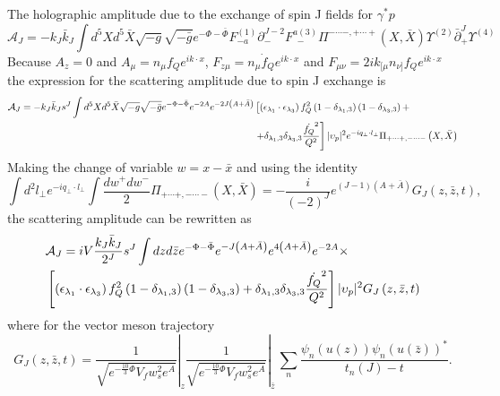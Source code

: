 \documentclass[10 pt]{article}
\begin{document}
The holographic amplitude due to the exchange of spin J fields for $\gamma^* p$
\begin{equation}
\mathcal{A}_J = - k_J \bar{k}_J \int d^5X d^5 \bar{X} \sqrt{-g} \sqrt{-\bar{g}} e^{-\Phi -\bar{\Phi}} F^{(1)}_{- a} \partial_{-}^{J-2} F^{a (3)}_{\, \, \, -} \Pi^{- \cdots -, + \cdots +} \left(X, \bar{X}\right) \Upsilon^{(2)} \bar{\partial}^J_{+} \Upsilon^{(4)}
\end{equation}
Because $A_z = 0$ and $A_\mu = n_\mu f_Q e^{i k \cdot x}$, $F_{z\mu} = n_\mu \dot{f}_Q e^{i k \cdot x}$ and $F_{\mu\nu} = 2 i k_{[\mu}n_{\nu]} f_Q e^{i k \cdot x}$
the expression for the scattering amplitude due to spin J exchange is
\begin{align}
\mathcal{A}_J = - k_J \bar{k}_J s^J \int d^5X d^5\bar{X} \sqrt{-g} \sqrt{-\bar{g}} e^{- \Phi - \bar{\Phi}} e^{-2A} e^{-2J\left(A+\bar{A}\right)} &\left[ \left( \epsilon_{\lambda_1} \cdot \epsilon_{\lambda_3}\right) f_Q^2 \left(1-\delta_{\lambda_1,3}\right) \left(1-\delta_{\lambda_3,3}\right) +  \right. \notag \\
&\left. + \delta_{\lambda_1,3} \delta_{\lambda_3, 3} \frac{\dot{f_Q}^2}{Q^2}\right] |\upsilon_p|^2 e^{-i q_\perp \cdot l_\perp} \Pi_{+ \cdots +, - \cdots -} \left(X, \bar{X}\right)
\end{align}
Making the change of variable $w = x - \bar{x}$  and using the identity
\begin{equation}
\int d^2 l_\perp e^{- i q_\perp \cdot l_\perp}\int \frac{dw^+ dw^-}{2} \Pi_{+\cdots+, - \cdots -} \left(X, \bar{X}\right) = - \frac{i}{\left(-2\right)^J} e^{\left(J-1\right)\left(A+\bar{A}\right)} G_J \left(z, \bar{z}, t\right),
\end{equation}
the scattering amplitude can be rewritten as
\begin{align}
&\mathcal{A}_J = i V \frac{k_J \bar{k}_J}{2^J} s^J \int dz d\bar{z} e^{-\Phi -\bar{\Phi}} e^{-J\left(A+\bar{A}\right)} e^{4\left(A+\bar{A}\right)} e^{-2A} \times  \notag \\
&\left[ \left( \epsilon_{\lambda_1} \cdot \epsilon_{\lambda_3}\right) f_Q^2 \left(1-\delta_{\lambda_1,3}\right) \left(1-\delta_{\lambda_3,3}\right) + \delta_{\lambda_1,3} \delta_{\lambda_3, 3} \frac{\dot{f_Q}^2}{Q^2}\right]  |\upsilon_p|^2 G_J \left(z, \bar{z}, t\right)
\end{align}
 where for the vector meson trajectory
\begin{equation}
G_J \left(z, \bar{z}, t \right)  = \left.\frac{1}{\sqrt{e^{-\frac{10}{3}\Phi} V_f w_s^2 e^A}}\right|_z  \left.\frac{1}{\sqrt{e^{-\frac{10}{3}\Phi} V_f w_s^2 e^A}}\right|_{\bar{z}} \, \sum_n \frac{\psi_n \left(u\left(z\right)\right){\psi_n \left(u\left(\bar{z}\right)\right)}^*}{t_n(J)-t}.
\end{equation}
\end{document}
